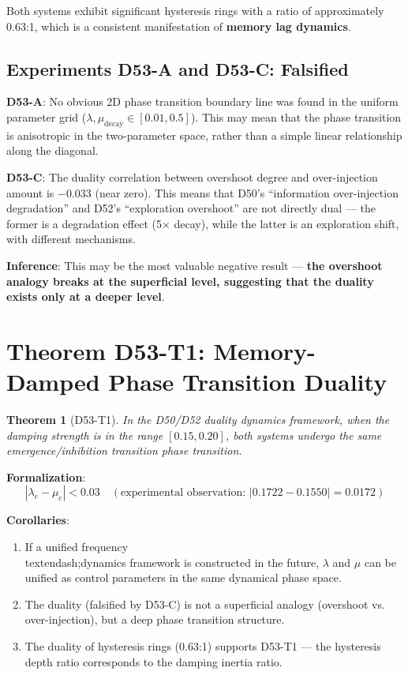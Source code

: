 \documentclass[12pt, a4paper]{article}
\newtheorem{theorem}{Theorem}[section]
\begin{document}
Both systems exhibit significant hysteresis rings with a ratio of approximately 0.63:1, which is a consistent manifestation of \textbf{memory lag dynamics}.

\subsection{Experiments D53-A and D53-C: Falsified}

\textbf{D53-A}: No obvious 2D phase transition boundary line was found in the uniform parameter grid ($\lambda, \mu_{\text{decay}} \in [0.01, 0.5]$). This may mean that the phase transition is anisotropic in the two-parameter space, rather than a simple linear relationship along the diagonal.

\textbf{D53-C}: The duality correlation between overshoot degree and over-injection amount is $-0.033$ (near zero). This means that D50's ``information over-injection degradation'' and D52's ``exploration overshoot'' are not directly dual --- the former is a degradation effect (5$\times$ decay), while the latter is an exploration shift, with different mechanisms.

\textbf{Inference}: This may be the most valuable negative result --- \textbf{the overshoot analogy breaks at the superficial level, suggesting that the duality exists only at a deeper level}.

\section{Theorem D53-T1: Memory-Damped Phase Transition Duality}

\begin{theorem}[D53-T1]\label{thm:d53-t1}
In the D50/D52 duality dynamics framework, when the damping strength is in the range $[0.15, 0.20]$, both systems undergo the same emergence/inhibition transition phase transition.
\end{theorem}

\textbf{Formalization}:
\begin{equation}
|\lambda_c - \mu_c| < 0.03 \quad (\text{experimental observation: } |0.1722 - 0.1550| = 0.0172)
\end{equation}

\textbf{Corollaries}:
\begin{enumerate}
    \item[P1] If a unified frequency\\textendash;dynamics framework is constructed in the future, $\lambda$ and $\mu$ can be unified as control parameters in the same dynamical phase space.
    \item[P2] The duality (falsified by D53-C) is not a superficial analogy (overshoot vs. over-injection), but a deep phase transition structure.
    \item[P3] The duality of hysteresis rings (0.63:1) supports D53-T1 --- the hysteresis depth ratio corresponds to the damping inertia ratio.
\end{enumerate}
\end{document}
